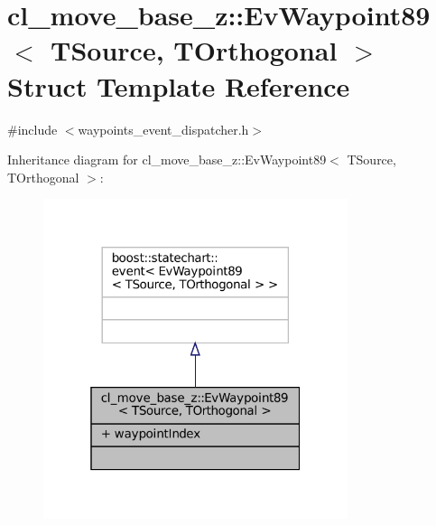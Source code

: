 \hypertarget{structcl__move__base__z_1_1EvWaypoint89}{}\section{cl\+\_\+move\+\_\+base\+\_\+z\+:\+:Ev\+Waypoint89$<$ T\+Source, T\+Orthogonal $>$ Struct Template Reference}
\label{structcl__move__base__z_1_1EvWaypoint89}


{\ttfamily \#include $<$waypoints\+\_\+event\+\_\+dispatcher.\+h$>$}



Inheritance diagram for cl\+\_\+move\+\_\+base\+\_\+z\+:\+:Ev\+Waypoint89$<$ T\+Source, T\+Orthogonal $>$\+:
\nopagebreak
\begin{figure}[H]
\begin{center}
\leavevmode
\includegraphics[width=253pt]{structcl__move__base__z_1_1EvWaypoint89__inherit__graph}
\end{center}
\end{figure}


